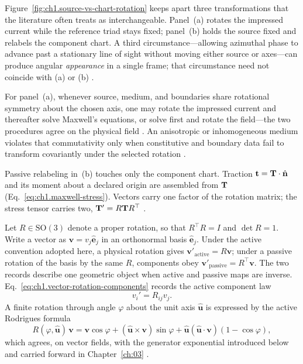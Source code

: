 Figure~\ref{fig:ch1.source-vs-chart-rotation} keeps apart three transformations that the literature often treats as interchangeable. Panel~(a) rotates the impressed current while the reference triad stays fixed; panel~(b) holds the source fixed and relabels the component chart. A third circumstance---allowing azimuthal phase to advance past a stationary line of sight without moving either source or axes---can produce angular \emph{appearance} in a single frame; that circumstance need not coincide with (a) or (b) \cite{hansen1988}.

For panel~(a), whenever source, medium, and boundaries share rotational symmetry about the chosen axis, one may rotate the impressed current and thereafter solve Maxwell's equations, or solve first and rotate the field---the two procedures agree on the physical field \cite{stratton1941,hansen1988}. An anisotropic or inhomogeneous medium violates that commutativity only when constitutive and boundary data fail to transform covariantly under the selected rotation \cite{stratton1941}.

Passive relabeling in~(b) touches only the component chart. Traction $\mathbf{t}=\mathbf{T}\cdot\hat{\mathbf{n}}$ and its moment about a declared origin are assembled from $\mathbf{T}$ (Eq.~\eqref{eq:ch1.maxwell-stress}). Vectors carry one factor of the rotation matrix; the stress tensor carries two, $\mathbf{T}'=R\mathbf{T} R^\top$ \cite{beth1936,stratton1941}.

Let $R\in\mathrm{SO}(3)$ denote a proper rotation, so that $R^\top R=I$ and $\det R=1$. Write a vector as $\mathbf{v}=v_j\hat{\mathbf{e}}_j$ in an orthonormal basis $\hat{\mathbf{e}}_j$. Under the active convention adopted here, a physical rotation gives $\mathbf{v}'_{\mathrm{active}}=R\mathbf{v}$; under a passive rotation of the basis by the same $R$, components obey $\mathbf{v}'_{\mathrm{passive}}=R^\top\mathbf{v}$. The two records describe one geometric object when active and passive maps are inverse. Eq.~\eqref{eq:ch1.vector-rotation-components} records the active component law
\begin{equation}
\label{eq:ch1.vector-rotation-components}
v_i' = R_{ij}v_j.
\end{equation}
A finite rotation through angle \(\varphi\) about the unit axis \(\hat{\mathbf{u}}\) is expressed by the active Rodrigues formula
\begin{equation}
\label{eq:ch1.rodrigues-rotation}
R(\varphi,\hat{\mathbf{u}})\,\mathbf{v}
=
\mathbf{v}\cos\varphi
+(\hat{\mathbf{u}}\times\mathbf{v})\sin\varphi
+\hat{\mathbf{u}}(\hat{\mathbf{u}}\cdot\mathbf{v})(1-\cos\varphi),
\end{equation}
which agrees, on vector fields, with the generator exponential introduced below and carried forward in Chapter~\ref{ch:03} \cite{jackson1999,stratton1941}.

